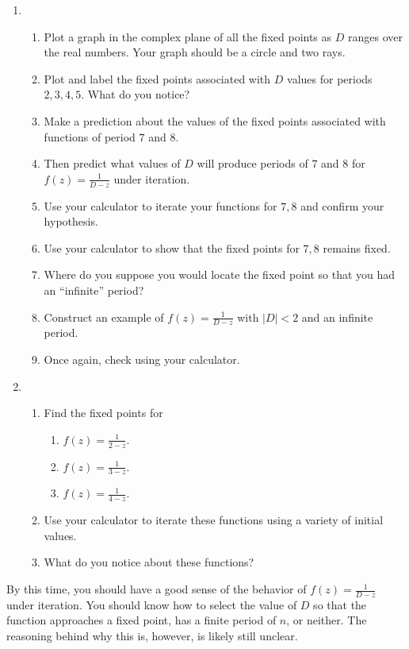 \documentclass[../gatm.tex]{subfiles}
\begin{document}
\begin{enumerate}
\setcounter{enumi}{\value{problem_i}}
\item \begin{enumerate}
\item Plot a graph in the complex plane of all the fixed points as $D$ ranges over the real numbers. Your graph should be a circle and two rays.
\item Plot and label the fixed points associated with $D$ values for periods $2,3,4,5$. What do you notice?
\item Make a prediction about the values of the fixed points associated with functions of period $7$ and $8$.
\item Then predict what values of $D$ will produce periods of $7$ and $8$ for $f(z)=\frac{1}{D-z}$ under iteration.
\item Use your calculator to iterate your functions for $7,8$ and confirm your hypothesis.
\item Use your calculator to show that the fixed points for $7,8$ remains fixed.
\item Where do you suppose you would locate the fixed point so that you had an ``infinite'' period?
\item Construct an example of $f(z)=\frac{1}{D-z}$ with $|D|<2$ and an infinite period.
\item Once again, check using your calculator.
\end{enumerate}
\item \begin{enumerate}
\item Find the fixed points for \begin{multicols}{3}
\begin{enumerate}
\item $f(z)=\frac{1}{2-z}.$
\item $f(z)=\frac{1}{3-z}.$
\item $f(z)=\frac{1}{4-z}.$
\end{enumerate}
\end{multicols}
\item Use your calculator to iterate these functions using a variety of initial values.
\item What do you notice about these functions?
\end{enumerate}
\setcounter{problem_i}{\value{enumi}}
\end{enumerate}

By this time, you should have a good sense of the behavior of $f(z)=\frac{1}{D-z}$ under iteration. You should know how to select the value of $D$ so that the function approaches a fixed point, has a finite period of $n$, or neither. The reasoning behind why this is, however, is likely still unclear.
\end{document}
